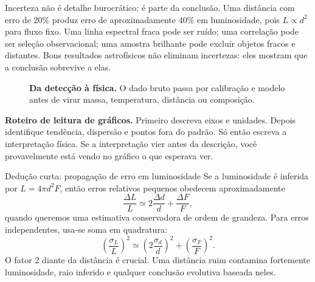 \documentclass[11pt,a4paper]{article}
\begin{document}
Incerteza não é detalhe burocrático; é parte da conclusão. Uma distância com erro de 20\% produz erro de aproximadamente 40\% em luminosidade, pois $L\propto d^2$ para fluxo fixo. Uma linha espectral fraca pode ser ruído; uma correlação pode ser seleção observacional; uma amostra brilhante pode excluir objetos fracos e distantes. Bons resultados astrofísicos não eliminam incertezas: eles mostram que a conclusão sobrevive a elas.

\begin{figure}[htbp]
\centering
{}
\caption{\textbf{Da detecção à física.} O dado bruto passa por calibração e modelo antes de virar massa, temperatura, distância ou composição.}
\label{fig:deteccaofisica}
\end{figure}

\textbf{Roteiro de leitura de gráficos.} Primeiro descreva eixos e unidades. Depois identifique tendência, dispersão e pontos fora do padrão. Só então escreva a interpretação física. Se a interpretação vier antes da descrição, você provavelmente está vendo no gráfico o que esperava ver.

\begin{lessonblock}[borderline west={2pt}{0pt}{astroGold}]{Dedução curta: propagação de erro em luminosidade}
Se a luminosidade é inferida por $L=4\pi d^2F$, então erros relativos pequenos obedecem aproximadamente
\[
\frac{\Delta L}{L}\simeq 2\frac{\Delta d}{d}+\frac{\Delta F}{F},
\]
quando queremos uma estimativa conservadora de ordem de grandeza. Para erros independentes, usa-se soma em quadratura:
\[
\left(\frac{\sigma_L}{L}\right)^2\simeq \left(2\frac{\sigma_d}{d}\right)^2+\left(\frac{\sigma_F}{F}\right)^2.
\]
O fator 2 diante da distância é crucial. Uma distância ruim contamina fortemente luminosidade, raio inferido e qualquer conclusão evolutiva baseada neles.
\end{lessonblock}
\end{document}
